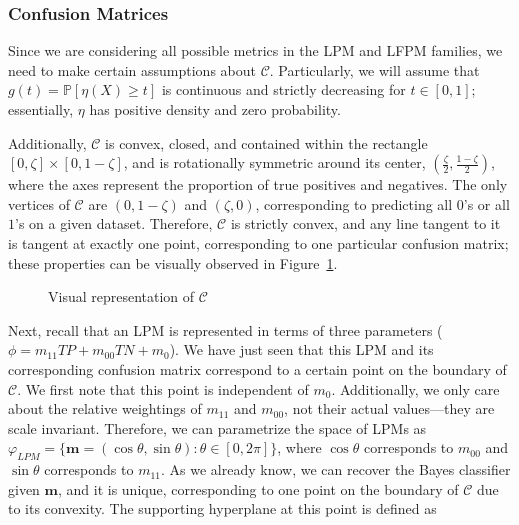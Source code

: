 \documentclass[
  letterpaper,
  numbers=noenddot,
  DIV=11]{scrreprt}
\theoremstyle{definition}
\theoremstyle{plain}
\theoremstyle{plain}
\theoremstyle{remark}
\begin{document}
\subsubsection*{Confusion Matrices}\label{sec-confusion-matrices}

Since we are considering all possible metrics in the LPM and LFPM
families, we need to make certain assumptions about \(\mathcal{C}\).
Particularly, we will assume that \(g(t) = \mathbb{P}[\eta(X) \geq t]\)
is continuous and strictly decreasing for \(t \in [0, 1]\); essentially,
\(\eta\) has positive density and zero probability.

Additionally, \(\mathcal{C}\) is convex, closed, and contained within
the rectangle \([0, \zeta] \times [0, 1-\zeta]\), and is rotationally
symmetric around its center, \((\frac{\zeta}{2}, \frac{1-\zeta}{2})\),
where the axes represent the proportion of true positives and negatives.
The only vertices of \(\mathcal{C}\) are \((0, 1-\zeta)\) and
\((\zeta, 0)\), corresponding to predicting all \(0\)'s or all \(1\)'s
on a given dataset. Therefore, \(\mathcal{C}\) is strictly convex, and
any line tangent to it is tangent at exactly one point, corresponding to
one particular confusion matrix; these properties can be visually
observed in Figure~\ref{fig-c}.

\begin{figure}


\caption{\label{fig-c}Visual representation of \(\mathcal{C}\)}

\end{figure}%

Next, recall that an LPM is represented in terms of three parameters
(\(\phi = m_{11}TP + m_{00}TN + m_0\)). We have just seen that this LPM
and its corresponding confusion matrix correspond to a certain point on
the boundary of \(\mathcal{C}\). We first note that this point is
independent of \(m_0\). Additionally, we only care about the relative
weightings of \(m_{11}\) and \(m_{00}\), not their actual values---they
are scale invariant. Therefore, we can parametrize the space of LPMs as
\(\varphi_{LPM} = \{\mathbf{m} = (\cos \theta, \sin \theta) : \theta \in [0, 2\pi]\}\),
where \(\cos \theta\) corresponds to \(m_{00}\) and \(\sin \theta\)
corresponds to \(m_{11}\). As we already know, we can recover the Bayes
classifier given \(\mathbf{m}\), and it is unique, corresponding to one
point on the boundary of \(\mathcal{C}\) due to its convexity. The
supporting hyperplane at this point is defined as
\end{document}

